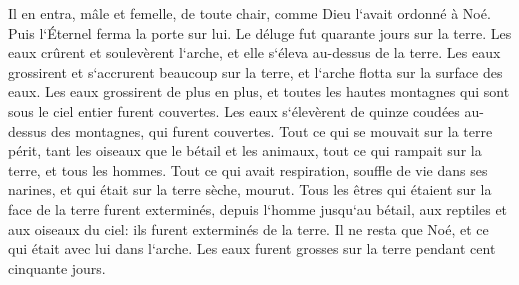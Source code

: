 \verse Il en entra, mâle et femelle, de toute chair, comme Dieu l`avait ordonné à Noé. Puis l`Éternel ferma la porte sur lui. 
\verse Le déluge fut quarante jours sur la terre. Les eaux crûrent et soulevèrent l`arche, et elle s`éleva au-dessus de la terre. 
\verse Les eaux grossirent et s`accrurent beaucoup sur la terre, et l`arche flotta sur la surface des eaux. 
\verse Les eaux grossirent de plus en plus, et toutes les hautes montagnes qui sont sous le ciel entier furent couvertes. 
\verse Les eaux s`élevèrent de quinze coudées au-dessus des montagnes, qui furent couvertes. 
\verse Tout ce qui se mouvait sur la terre périt, tant les oiseaux que le bétail et les animaux, tout ce qui rampait sur la terre, et tous les hommes. 
\verse Tout ce qui avait respiration, souffle de vie dans ses narines, et qui était sur la terre sèche, mourut. 
\verse Tous les êtres qui étaient sur la face de la terre furent exterminés, depuis l`homme jusqu`au bétail, aux reptiles et aux oiseaux du ciel: ils furent exterminés de la terre. Il ne resta que Noé, et ce qui était avec lui dans l`arche. 
\verse Les eaux furent grosses sur la terre pendant cent cinquante jours. 

